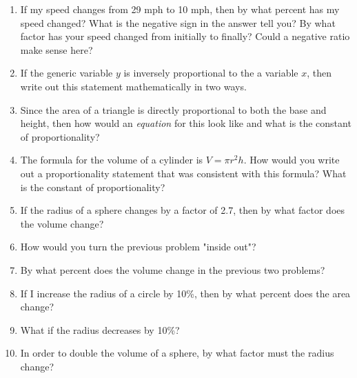 \begin{enumerate}
\item If my speed changes from 29 mph to 10 mph, then by what percent has my speed changed? What is the negative sign in the answer tell you? By what factor has your speed changed from initially to finally? Could a negative ratio make sense here?\\

\item If the generic variable $y$ is inversely proportional to the a variable $x$, then write out this statement mathematically in two ways.\\

\item Since the area of a triangle is directly proportional to both the base and height, then how would an \emph{equation} for this look like and what is the constant of proportionality?\\

\item The formula for the volume of a cylinder is $V=\pi r^2 h$. How would you write out a proportionality statement that was consistent with this formula? What is the constant of proportionality?\\

\item If the radius of a sphere changes by a factor of 2.7, then by what factor does the volume change?\\

\item How would you turn the previous problem "inside out"? 

\item By what percent does the volume change in the previous two problems?

\item If I increase the radius of a circle by 10\%, then by what percent does the area change?

\item What if the radius decreases by 10\%?

\item In order to double the volume of a sphere, by what factor must the radius change? 
	
\end{enumerate}